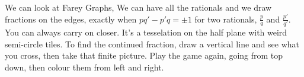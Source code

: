 \documentclass{article}
\begin{document}
We can look at Farey Graphs,
We can have all the rationals and we draw fractions on the edges, exactly when $pq' - p'q =\pm1$ for two rationals, $\frac{p}{q}$ and $\frac{p'}{q'}$. You can always carry on closer. It's a tesselation on the half plane with weird semi-circle tiles. To find the continued fraction, draw a vertical line and see what you cross, then take that finite picture. Play the game again, going from top down, then colour them from left and right. \\

\newpage

\end{document}
